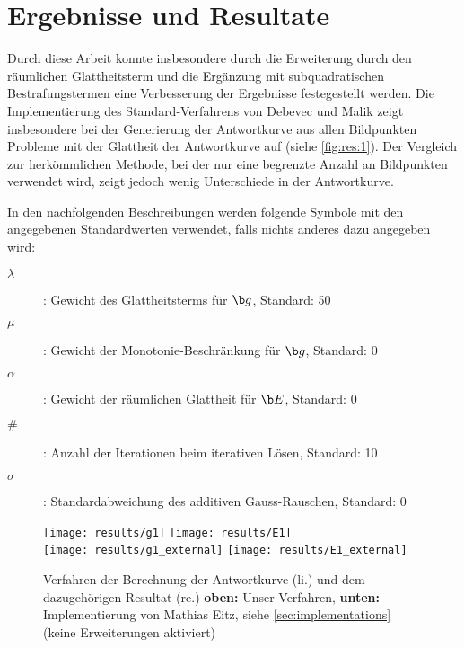 
\chapter{Ergebnisse und Resultate}
\label{chap:results}

Durch diese Arbeit konnte insbesondere durch die Erweiterung durch den räumlichen Glattheitsterm und die Ergänzung mit subquadratischen Bestrafungstermen eine Verbesserung der Ergebnisse festegestellt werden.
Die Implementierung des Standard-Verfahrens von Debevec und Malik zeigt insbesondere bei der Generierung der Antwortkurve aus allen Bildpunkten Probleme mit der Glattheit der Antwortkurve auf (siehe \autoref{fig:res:1}). Der Vergleich zur herkömmlichen Methode, bei der nur eine begrenzte Anzahl an Bildpunkten verwendet wird, zeigt jedoch wenig Unterschiede in der Antwortkurve.

In den nachfolgenden Beschreibungen werden folgende Symbole mit den angegebenen Standardwerten verwendet, falls nichts anderes dazu angegeben wird:
\begin{description}
\item[$\lambda$]: Gewicht des Glattheitsterms für $\b g$, Standard: 50
\item[$\mu$]: Gewicht der Monotonie-Beschränkung für $\b g$, Standard: 0
\item[$\alpha$]: Gewicht der räumlichen Glattheit für $\b E$, Standard: 0
\item[$\#$]: Anzahl der Iterationen beim iterativen Lösen, Standard: 10
\item[$\sigma$]: Standardabweichung des additiven Gauss-Rauschen, Standard: 0
\end{description}


\begin{figure}
  \begin{center}
    \texttt{[image: results/g1]}
    \texttt{[image: results/E1]}
    \\ \vspace{5pt}
    \texttt{[image: results/g1\_external]}
    \texttt{[image: results/E1\_external]}
    \caption{Verfahren der Berechnung der Antwortkurve (li.) und dem dazugehörigen Resultat (re.) \textbf{oben:} Unser Verfahren, \textbf{unten:} Implementierung von Mathias Eitz, siehe \autoref{sec:implementations}  (keine Erweiterungen aktiviert)}
    \label{fig:res:1}
  \end{center}
\end{figure}

